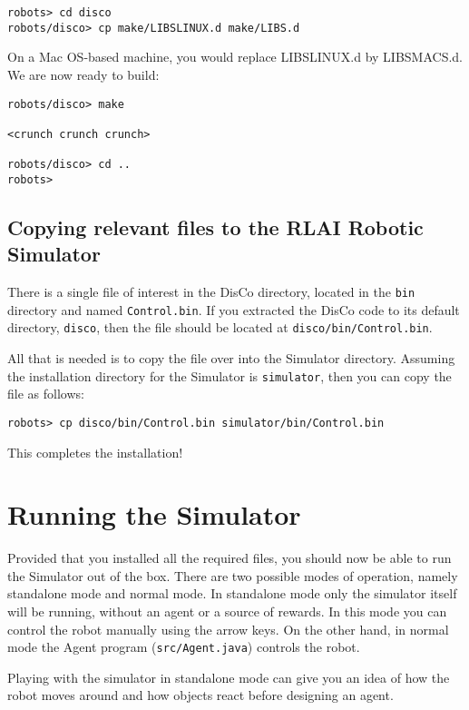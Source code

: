 \documentclass[12pt]{article}
\begin{document}
\begin{verbatim}
robots> cd disco
robots/disco> cp make/LIBSLINUX.d make/LIBS.d
\end{verbatim}

On a Mac OS-based machine, you would replace LIBSLINUX.d by LIBSMACS.d. We 
are now ready to build:

\begin{verbatim}
robots/disco> make

<crunch crunch crunch>

robots/disco> cd ..
robots>
\end{verbatim}


\subsection{Copying relevant files to the RLAI Robotic Simulator}

There is a single file of interest in the DisCo directory, located in the
\verb+bin+ directory and named \verb+Control.bin+. If you extracted the 
DisCo code to its default directory, \verb+disco+, then the file should 
be located at \verb+disco/bin/Control.bin+.

All that is needed is to copy the file over into the Simulator directory.
Assuming the installation directory for the Simulator is \verb+simulator+,
then you can copy the file as follows:

\begin{verbatim}
robots> cp disco/bin/Control.bin simulator/bin/Control.bin
\end{verbatim}

This completes the installation! 

\section{Running the Simulator}

Provided that you installed all the required files, you should now be able to
run the Simulator out of the box. There are two possible modes of operation,
namely standalone mode and normal mode. In standalone mode only the simulator
itself will be running, without an agent or a source of rewards. In this mode
you can control the robot manually using the arrow keys. On the other hand,
in normal mode the Agent program (\verb+src/Agent.java+) controls the robot.

Playing with the simulator in standalone mode can give you an idea of how the
robot moves around and how objects react before designing an agent.
\end{document}
